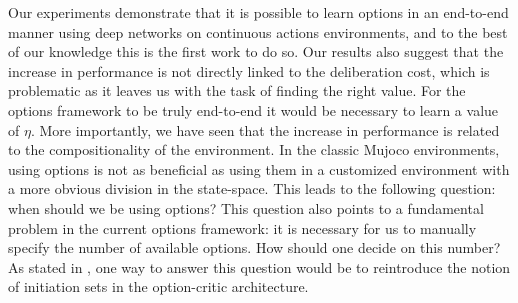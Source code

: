 \documentclass{article}
\begin{document}
Our experiments  demonstrate that it is possible to learn options in an end-to-end manner using deep networks on continuous actions environments, and to the best of our knowledge this is the first work to do so. Our results also suggest that the increase in performance is not directly linked to the deliberation cost, which is problematic as it leaves us with the task of finding the right value. For the options framework to be truly end-to-end it would be necessary to learn a value of $\eta$.
More importantly, we have seen that the increase in performance is related to the compositionality of the environment. In the classic Mujoco environments, using options is not as beneficial as using them in a customized environment with a more obvious division in the state-space. This leads to the following question: when should we be using options? This question also points to a fundamental problem in the current options framework: it is necessary for us to manually specify the number of available options. How should one decide on this number? As stated in \cite{Bacon2017}, one way to answer this question would be to reintroduce the notion of initiation sets in the option-critic architecture.



% 

\clearpage
\end{document}

